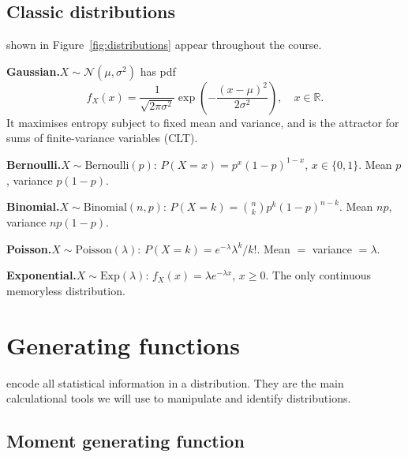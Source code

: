 \documentclass[justified,notoc]{tufte-handout}
\def\N{\mathcal{N}}
\begin{document}
\subsection{Classic distributions}

 shown in Figure~\ref{fig:distributions} appear throughout the course.

\medskip
\noindent\textbf{Gaussian.}\quad $X\sim\N(\mu,\sigma^2)$ has pdf
\begin{equation}
  f_X(x)=\frac{1}{\sqrt{2\pi\sigma^2}}\exp\!\left(-\frac{(x-\mu)^2}{2\sigma^2}\right), \quad x\in\mathbb{R}.
  \label{eq:gaussian_pdf}
\end{equation}
It maximises entropy subject to fixed mean and variance, and is the attractor for sums of finite-variance variables (CLT).

\medskip
\noindent\textbf{Bernoulli.}\quad $X\sim\text{Bernoulli}(p)$: $P(X=x)=p^x(1-p)^{1-x}$, $x\in\{0,1\}$.
Mean $p$, variance $p(1-p)$.

\medskip
\noindent\textbf{Binomial.}\quad $X\sim\text{Binomial}(n,p)$: $P(X=k)=\binom{n}{k}p^k(1-p)^{n-k}$.
Mean $np$, variance $np(1-p)$.

\medskip
\noindent\textbf{Poisson.}\quad $X\sim\text{Poisson}(\lambda)$: $P(X=k)=e^{-\lambda}\lambda^k/k!$.
Mean $=$ variance $=\lambda$.

\medskip
\noindent\textbf{Exponential.}\quad $X\sim\text{Exp}(\lambda)$: $f_X(x)=\lambda e^{-\lambda x}$, $x\geq 0$.
The only continuous memoryless distribution.

\section{Generating functions}

 encode all statistical information in a distribution. They are the main calculational tools we will use to manipulate and identify distributions.

\subsection{Moment generating function}
\end{document}
